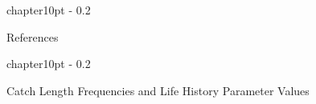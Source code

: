 \documentclass{report}\usepackage[]{graphicx}\usepackage[]{color}
\makeatletter
\renewcommand\chapter{\@startsection%
{chapter}{1}{0pt}%
{-\baselineskip}%
{0.2\baselineskip}%
{\raggedright\bf}}%
\makeatother
\begin{document}
\clearpage
\newpage

\chapter{References}


\clearpage
\newpage

\chapter{Catch Length Frequencies and Life History Parameter Values}


\clearpage
\newpage

\setlength{\tabcolsep}{5pt}
\captionsetup{width=1\textwidth, justification=centering}
\setlength{\LTpost}{0pt}
\end{document}
